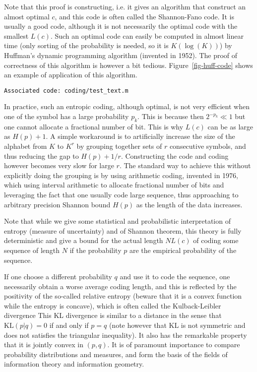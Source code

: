 Note that this proof is constructing, i.e. it gives an algorithm that construct an almost optimal $c$, and this code is often called the Shannon-Fano code. It is usually a good code, although it is not necessarily the optimal code with the smallest $L(c)$. Such an optimal code can easily be computed in almost linear time (only sorting of the probability is needed, so it is $K(\log(K))$) by Huffman's dynamic programming algorithm (invented in 1952). The proof of correctness of this algorithm is however a bit tedious. Figure~\ref{fig-huff-code} shows an example of application of this algorithm.


\texttt{Associated code: coding/test\_text.m}

In practice, such an entropic coding, although optimal, is not very efficient when one of the symbol has a large probability $p_k$. This is because then $2^{-p_k} \ll 1$ but one cannot allocate a fractional number of bit. This is why $L(c)$ can be as large as $H(p)+1$. A simple workaround is to artificially increase the size of the alphabet from $K$ to $K^r$ by grouping together sets of $r$ consecutive symbols, and thus reducing the gap to $H(p)+1/r$. Constructing the code and coding however becomes very slow for large $r$. The standard way to achieve this without explicitly doing the grouping is by using arithmetic coding, invented in 1976, which using interval arithmetic to allocate fractional number of bits and leveraging the fact that one usually code large sequence, thus approaching to arbitrary precision Shannon bound $H(p)$ as the length of the data increases.



Note that while we give some statistical and probabilistic interpretation of entropy (measure of uncertainty) and of Shannon theorem, this theory is fully deterministic and give a bound for the actual length $N L(c)$ of coding some sequence of length $N$ if the probability $p$ are the empirical probability of the sequence.

If one choose a different probability $q$ and use it to code the sequence, one necessarily obtain a worse average coding length, and this is reflected by the positivity of the so-called relative entropy (beware that it is a convex function while the entropy is concave), which is often called the Kulback-Leibler divergence
This KL divergence is similar to a distance in the sense that $\text{KL}(p|q)=0$ if and only if $p=q$ (note however that KL is not symmetric and does not satisfies the triangular inequality). It also has the remarkable property that it is jointly convex in $(p,q)$. It is of paramount importance to compare probability distributions and measures, and form the basis of the fields of information theory and information geometry. 



